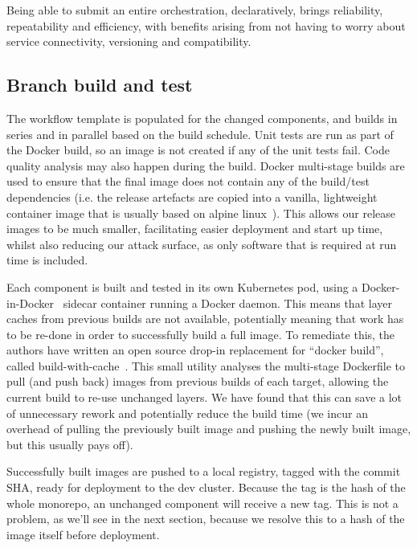 \documentclass[reprint,amsmath,amssymb,aps]{revtex4-1}
\begin{document}
Being able to submit an entire orchestration, declaratively, brings reliability, repeatability and efficiency, with benefits arising from not having to worry about service connectivity, versioning and compatibility.

\subsection{\label{sec:branchbuild}Branch build and test}

The workflow template is populated for the changed components, and builds in series and in parallel based on the build schedule. Unit tests are run as part of the Docker build, so an image is not created if any of the unit tests fail. Code quality analysis may also happen during the build. Docker multi-stage builds are used to ensure that the final image does not contain any of the build/test dependencies (i.e. the release artefacts are copied into a vanilla, lightweight container image that is usually based on alpine linux~\cite{indexAlp12:online}). This allows our release images to be much smaller, facilitating easier deployment and start up time, whilst also reducing our attack surface, as only software that is required at run time is included.

Each component is built and tested in its own Kubernetes pod, using a Docker-in-Docker~\cite{libraryd61:online} sidecar container running a Docker daemon. This means that layer caches from previous builds are not available, potentially meaning that work has to be re-done in order to successfully build a full image. To remediate this, the authors have written an open source drop-in replacement for “docker build”, called build-with-cache~\cite{redbadge83:online}. This small utility analyses the multi-stage Dockerfile to pull (and push back) images from previous builds of each target, allowing the current build to re-use unchanged layers. We have found that this can save a lot of unnecessary rework and potentially reduce the build time (we incur an overhead of pulling the previously built image and pushing the newly built image, but this usually pays off).

Successfully built images are pushed to a local registry, tagged with the commit SHA, ready for deployment to the dev cluster. Because the tag is the hash of the whole monorepo, an unchanged component will receive a new tag. This is not a problem, as we'll see in the next section, because we resolve this to a hash of the image itself before deployment.
\end{document}
